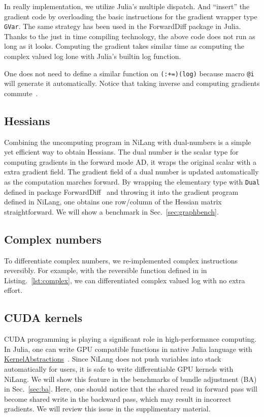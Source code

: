 \documentclass{article}
\newcommand{\<}{\langle}
\renewcommand{\>}{\rangle}
\newcommand{\Lst}[1]{Listing.~\ref{#1}}
\newcommand{\Sec}[1]{Sec.~\ref{#1}}
\theoremstyle{definition}\newtheorem{definition}{\textit{Definition}}
\begin{document}
In really implementation, we utilize Julia's multiple dispatch. And ``insert'' the gradient code by overloading the basic instructions for the gradient wrapper type \texttt{GVar}.
The same strategy has been used in the ForwardDiff package in Julia.
Thanks to the just in time compiling technology, the above code does not run as long as it looks. Computing the gradient takes similar time as computing the complex valued log lone with Julia's builtin log function.

One does not need to define a similar function on \texttt{(:+=)(log)} because macro \texttt{@i} will generate it automatically. Notice that taking inverse and computing gradients commute~\cite{Mcinerney2015}.

\subsection{Hessians}
Combining the uncomputing program in NiLang with dual-numbers is a simple yet efficient way to obtain Hessians.
The dual number is the scalar type for computing gradients in the forward mode AD, it wraps the original scalar with a extra gradient field. The gradient field of a dual number is updated automatically as the computation marches forward.
By wrapping the elementary type with \texttt{Dual} defined in package ForwardDiff~\cite{Revels2016} and throwing it into the gradient program defined in NiLang,
one obtains one row/column of the Hessian matrix straightforward.
We will show a benchmark in \Sec{sec:graphbench}.

\subsection{Complex numbers}
To differentiate complex numbers, we re-implemented complex instructions reversibly. For example, with the reversible function defined in in \Lst{lst:complex}, we can differentiated complex valued log with no extra effort.

\subsection{CUDA kernels}
CUDA programming is playing a significant role in high-performance computing. In Julia, one can write GPU compatible functions in native Julia language with \href{https://github.com/JuliaGPU/KernelAbstractions.jl}{KernelAbstractions}~\cite{Besard2018}.
Since NiLang does not push variables into stack automatically for users, it is safe to write differentiable GPU kernels with NiLang.
We will show this feature in the benchmarks of bundle adjustment (BA) in \Sec{sec:ba}.
Here, one should notice that the shared read in forward pass will become shared write in the backward pass, which may result in incorrect gradients. We will review this issue in the supplimentary material.
\end{document}
